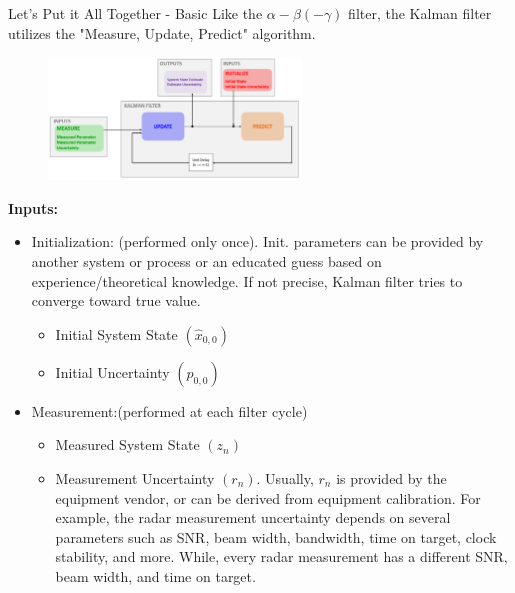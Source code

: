 \begin{frame}{Let's Put it All Together - Basic}
Like the $\alpha - \beta (-\gamma)$ filter, the Kalman filter utilizes the "Measure, Update, Predict" algorithm.
        \begin{figure}
		   \centering
		   \includegraphics[width=0.6\textwidth]{Figures/Chapter1/KalmanFilterAlgorithm.png}
		   \label{fig:PDFs}
	    \end{figure}
	    \vspace{-10pt}
	\textbf{Inputs:}
	\begin{itemize}
	    \item Initialization: (performed only once). Init. parameters can be provided by another system or process or an educated guess based on experience/theoretical knowledge. If not precise, Kalman filter tries to converge toward true value.
	       \begin{itemize}
	           \item Initial System State $(\hat{x}_{0,0})$
	           \item Initial Uncertainty $(p_{0,0})$
	       \end{itemize} 
	    \item Measurement:(performed at each filter cycle)
	        \begin{itemize}
	           \item Measured System State $(z_n)$
	           \item Measurement Uncertainty $(r_n)$. Usually,  $r_n$ is provided by the equipment vendor, or can be derived from equipment calibration. For example, the radar measurement uncertainty depends on several parameters such as SNR, beam width, bandwidth, time on target, clock stability, and more. While, every radar measurement has a different SNR, beam width, and time on target.
	       \end{itemize} 
	\end{itemize}
\end{frame}

